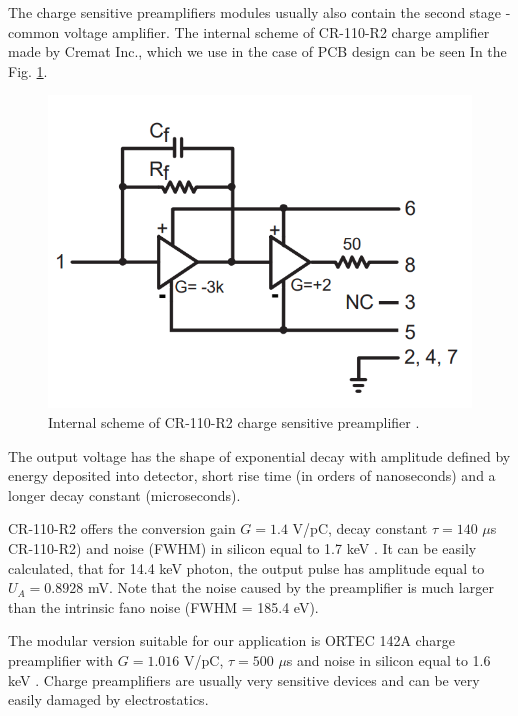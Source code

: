 \par
The charge sensitive preamplifiers modules usually also contain the second stage - common voltage amplifier. The internal scheme of CR-110-R2 charge amplifier made by Cremat Inc., which we use in the case of PCB design can be seen In the Fig. \ref{internal}.

\par

\begin{figure}[H]
 \centering
 \includegraphics[scale=0.35, angle = 0]{./pictures/CRpreamp.png}
 \caption{Internal scheme of CR-110-R2 charge sensitive preamplifier \cite{cr110}.}
 \label{internal}
 
\end{figure}

The output voltage has the shape of exponential decay with amplitude defined by energy deposited into detector, short rise time (in orders of nanoseconds) and a longer decay constant (microseconds).


CR-110-R2 offers the conversion gain $G = 1.4$ V/pC, decay constant $\tau = 140$ $\mu$s CR-110-R2) and noise (FWHM) in silicon equal to 1.7 keV \cite{cr110}. It can be easily calculated, that for 14.4 keV photon, the output pulse has amplitude equal to $U_{A} = 0.8928$ mV. 
Note that the noise caused by the preamplifier is much larger than the intrinsic fano noise (FWHM = 185.4 eV).


\par
The modular version suitable for our application is ORTEC 142A charge preamplifier with $G = 1.016$ V/pC, $\tau = 500$ $\mu$s and noise in silicon equal to 1.6 keV \cite{ORTECpreamp}. Charge preamplifiers are usually very sensitive devices and can be very easily damaged by electrostatics. 


